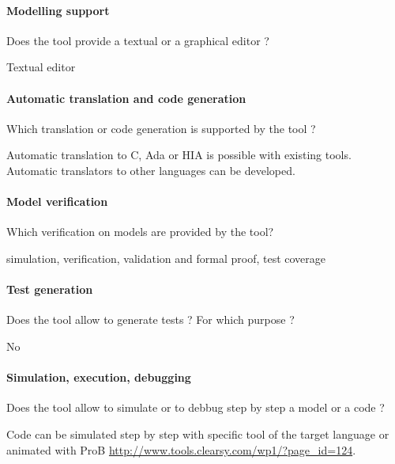 \paragraph{Modelling support}
Does the tool provide a  textual or a graphical editor ?

\begin{author_comment}
Textual editor
\end{author_comment}

\paragraph{Automatic translation and code generation}
Which translation or code generation is supported by the tool ?

\begin{author_comment}
Automatic translation to  C, Ada or HIA is possible with existing tools. Automatic translators to other languages can be developed.
\end{author_comment}

\paragraph{Model verification}
Which verification on models are provided by the tool?

\begin{author_comment}
simulation, verification, validation and formal proof, test coverage
\end{author_comment}

\paragraph{Test generation}
Does the tool allow to generate tests ? For  which purpose ?

\begin{author_comment}
No
\end{author_comment}

\paragraph{Simulation, execution, debugging}
Does the tool allow to simulate or to debbug step by step a model or a code ?

\begin{author_comment}
Code can be simulated step  by step with specific tool of the target language or animated with ProB \url{http://www.tools.clearsy.com/wp1/?page_id=124}.
\end{author_comment}


